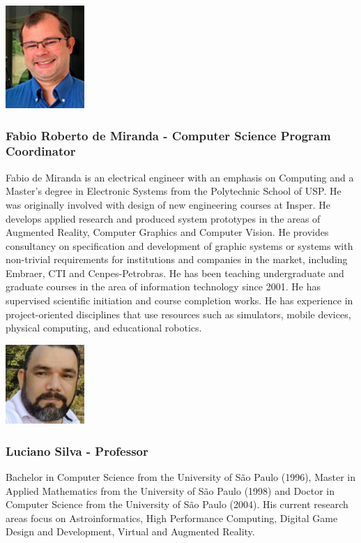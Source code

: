 \begin{multicols}{2}
\includegraphics[width=3cm]{imgs/fabio-miranda.jpg}
\columnbreak
\subsubsection{Fabio Roberto de Miranda - Computer Science Program Coordinator}
Fabio de Miranda is an electrical engineer with an emphasis on Computing and a Master's degree in Electronic Systems from the Polytechnic School of USP. He was originally involved with design of new engineering courses at Insper. He develops applied research and produced system prototypes in the areas of Augmented Reality, Computer Graphics and Computer Vision. He provides consultancy on specification and development of graphic systems or systems with non-trivial requirements for institutions and companies in the market, including Embraer, CTI and Cenpes-Petrobras. He has been teaching undergraduate and graduate courses in the area of information technology since 2001. He has supervised scientific initiation and course completion works. He has experience in project-oriented disciplines that use resources such as simulators, mobile devices, physical computing, and educational robotics.
\end{multicols}

\newpage
\begin{multicols}{2}
\includegraphics[width=3cm]{imgs/Luciano-Silva-17.jpg}
\columnbreak
\subsubsection{Luciano Silva - Professor}
Bachelor in Computer Science from the University of São Paulo (1996), Master in Applied Mathematics from the University of São Paulo (1998) and Doctor in Computer Science from the University of São Paulo (2004). His current research areas focus on Astroinformatics, High Performance Computing, Digital Game Design and Development, Virtual and Augmented Reality.
\end{multicols}

